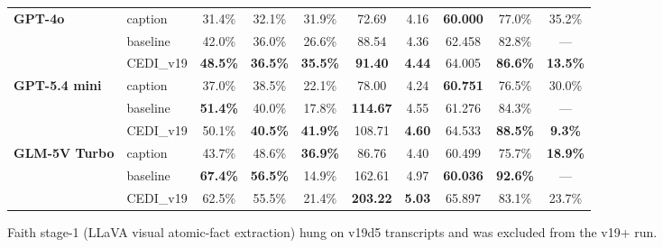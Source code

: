 \begin{table}[t]
\begin{tabular}{@{}l|l|cccccccc@{}}
\multirow{3}{*}{\parbox{2.5cm}{\centering\textbf{GPT-4o}}}
  & caption    & 31.4\% & 32.1\% & 31.9\% & 72.69 & 4.16 & \textbf{60.000} & 77.0\% & 35.2\% \\
  & baseline   & 42.0\% & 36.0\% & 26.6\% & 88.54 & 4.36 & 62.458 & 82.8\% & --- \\
\rowcolor[HTML]{E6F2FF}
  \multicolumn{1}{l}{\cellcolor[HTML]{E6F2FF}} & CEDI\_v19 & \textbf{48.5\%} & \textbf{36.5\%} & \textbf{35.5\%} & \textbf{91.40} & \textbf{4.44} & 64.005 & \textbf{86.6\%} & \textbf{13.5\%} \\
\midrule
\multirow{3}{*}{\parbox{2.5cm}{\centering\textbf{GPT-5.4 mini}}}
  & caption    & 37.0\% & 38.5\% & 22.1\% & 78.00 & 4.24 & \textbf{60.751} & 76.5\% & 30.0\% \\
  & baseline   & \textbf{51.4\%} & 40.0\% & 17.8\% & \textbf{114.67} & 4.55 & 61.276 & 84.3\% & --- \\
\rowcolor[HTML]{E6F2FF}
  \multicolumn{1}{l}{\cellcolor[HTML]{E6F2FF}} & CEDI\_v19 & 50.1\% & \textbf{40.5\%} & \textbf{41.9\%} & 108.71 & \textbf{4.60} & 64.533 & \textbf{88.5\%} & \textbf{9.3\%} \\
\midrule
\multirow{3}{*}{\parbox{2.5cm}{\centering\textbf{GLM-5V Turbo}}}
  & caption    & 43.7\% & 48.6\% & \textbf{36.9\%} & 86.76 & 4.40 & 60.499 & 75.7\% & \textbf{18.9\%} \\
  & baseline   & \textbf{67.4\%} & \textbf{56.5\%} & 14.9\% & 162.61 & 4.97 & \textbf{60.036} & \textbf{92.6\%} & --- \\
\rowcolor[HTML]{E6F2FF}
  \multicolumn{1}{l}{\cellcolor[HTML]{E6F2FF}} & CEDI\_v19 & 62.5\% & 55.5\% & 21.4\% & \textbf{203.22} & \textbf{5.03} & 65.897 & 83.1\% & 23.7\% \\
\bottomrule
\end{tabular}

\vspace{2pt}
\footnotesize
\noindent
 Faith stage-1 (LLaVA visual atomic-fact extraction) hung on v19d5 transcripts and was excluded from the v19+ run.

\end{table}